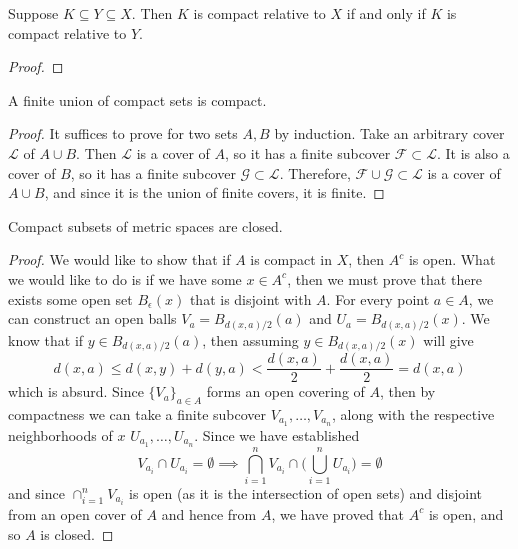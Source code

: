 \documentclass{article}
\begin{document}
    \begin{theorem}
      Suppose $K \subseteq Y \subseteq X$. Then $K$ is compact relative to $X$ if and only if $K$ is compact relative to $Y$. 
    \end{theorem}
    \begin{proof}

    \end{proof}

    \begin{theorem}
      A finite union of compact sets is compact. 
    \end{theorem}
    \begin{proof}
      It suffices to prove for two sets $A, B$ by induction. Take an arbitrary cover $\mathscr{L}$ of $A \cup B$. Then $\mathscr{L}$ is a cover of $A$, so it has a finite subcover $\mathscr{F} \subset \mathscr{L}$. It is also a cover of $B$, so it has a finite subcover $\mathscr{G} \subset \mathscr{L}$. Therefore, $\mathscr{F} \cup \mathscr{G} \subset \mathscr{L}$ is a cover of $A \cup B$, and since it is the union of finite covers, it is finite. 
    \end{proof}

    \begin{theorem}
      Compact subsets of metric spaces are closed. 
    \end{theorem}
    \begin{proof}
      We would like to show that if $A$ is compact in $X$, then $A^c$ is open. What we would like to do is if we have some $x \in A^c$, then we must prove that there exists some open set $B_\epsilon (x)$ that is disjoint with $A$. For every point $a \in A$, we can construct an open balls $V_a = B_{d(x, a)/2} (a)$ and $U_a = B_{d(x, a)/2} (x)$. We know that if $y \in B_{d(x, a)/2}(a)$, then assuming $y \in B_{d(x, a)/2} (x)$ will give
      \begin{equation}
        d(x, a) \leq d(x, y) + d(y, a) < \frac{d(x, a)}{2} + \frac{d(x, a)}{2} = d(x, a)
      \end{equation}
      which is absurd. 
      Since $\{V_a\}_{a \in A}$ forms an open covering of $A$, then by compactness we can take a finite subcover $V_{a_1}, \ldots, V_{a_n}$, along with the respective neighborhoods of $x$ $U_{a_1}, \ldots, U_{a_n}$. Since we have established 
      \begin{equation}
        V_{a_i} \cap U_{a_i} = \emptyset \implies \bigcap_{i=1}^n V_{a_i} \cap \bigg( \bigcup_{i=1}^n U_{a_i} \bigg) = \emptyset
      \end{equation}
      and since $\cap_{i=1}^n V_{a_i}$ is open (as it is the intersection of open sets) and disjoint from an open cover of $A$ and hence from $A$, we have proved that $A^c$ is open, and so $A$ is closed. 
    \end{proof}
\end{document}

